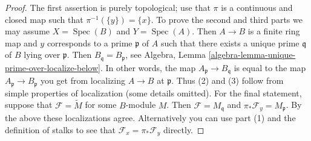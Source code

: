 \documentclass[10pt,a4paper]{amsart}
\theoremstyle{plain}
\theoremstyle{definition}
\theoremstyle{remark}
\numberwithin{equation}{subsection}
\def\Spec{\mathop{\mathrm{Spec}}}
\begin{document}
\begin{proof}
The first assertion is purely topological; use that
$\pi$ is a continuous and closed map such that $\pi^{-1}(\{y\}) = \{x\}$.
To prove the second and third parts we may assume
$X = \Spec(B)$ and $Y = \Spec(A)$. Then
$A \to B$ is a finite ring map and $y$ corresponds to a prime
$\mathfrak p$ of $A$ such that there exists a unique prime $\mathfrak q$ of
$B$ lying over $\mathfrak p$. Then
$B_{\mathfrak q} = B_{\mathfrak p}$, see
Algebra, Lemma \ref{algebra-lemma-unique-prime-over-localize-below}.
In other words, the map $A_{\mathfrak p} \to B_{\mathfrak q}$
is equal to the map $A_{\mathfrak p} \to B_{\mathfrak p}$ you get
from localizing $A \to B$ at $\mathfrak p$.
Thus (2) and (3) follow from simple properties of localization
(some details omitted). For the final statement, suppose that
$\mathcal{F} = \widetilde M$ for some $B$-module $M$.
Then $\mathcal{F} = M_{\mathfrak q}$ and
$\pi_*\mathcal{F}_y = M_{\mathfrak p}$. By the above these
localizations agree. Alternatively you can use part (1) and
the definition of stalks to see that $\mathcal{F}_x = \pi_*\mathcal{F}_y$
directly.
\end{proof}
\end{document}
